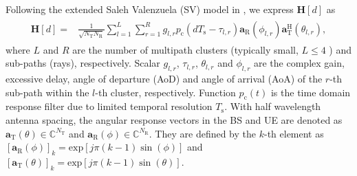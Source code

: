 \documentclass[journal]{IEEEtran}
\newcommand{\va}[1]{\mathbf{a}_{#1}}
\newcommand{\tx}[0]{\text{T}}
\newcommand{\rx}[0]{\text{R}}
\newcommand{\hermitian}[0]{\text{H}}
\newcommand{\transpose}[0]{\text{T}}
\newcommand{\STO}[0]{\epsilon_{\text{T}}}
\newcommand{\Ts}[0]{T_{\text{s}}}
\begin{document}
Following the extended Saleh Valenzuela (SV) model in \cite{7400949}, we express $\mathbf{H}[d]$ as 
\begin{align}
\begin{split}
\mathbf{H}[d] = &\frac{1}{\sqrt{N_{\tx}N_{\rx}}}\sum_{l=1}^{L}\sum_{r=1}^{R} g_{l,r} p_{\text{c}}(d\Ts-\tau_{l,r})\va{\rx}(\phi_{l,r}) \va{\tx}^{\hermitian}(\theta_{l,r}),
\end{split}
\label{eq:channel_model}
\end{align}
where $L$ and $R$ are the number of multipath clusters (typically small, $L\leq 4$ \cite{7109864}) and sub-paths (rays), respectively. Scalar $g_{l,r}$, $\tau_{l,r}$, $\theta_{l,r}$ and $\phi_{l,r}$ are the complex gain, excessive delay, angle of departure (AoD) and angle of arrival (AoA) of the $r$-th sub-path within the $l$-th cluster, respectively. \color{black}Function $p_{\text{c}}(t)$ is the time domain response filter due to limited temporal resolution $\Ts$. \color{black} 
With half wavelength antenna spacing, the angular response vectors in the BS and UE are denoted as $\va{\tx}(\theta)\in\mathbb{C}^{N_{\tx}}$ and $\va{\rx}(\phi)\in\mathbb{C}^{N_{\rx}}$. They are defined by the $k$-th element as 
$[\mathbf{a}_{\rx}(\phi)]_{k}  = \text{exp}[j\pi(k-1)\sin(\phi)]$ and $[\mathbf{a}_{\tx}(\theta)]_{k}  = \text{exp}[j\pi(k-1)\sin(\theta)]$.
\end{document}
